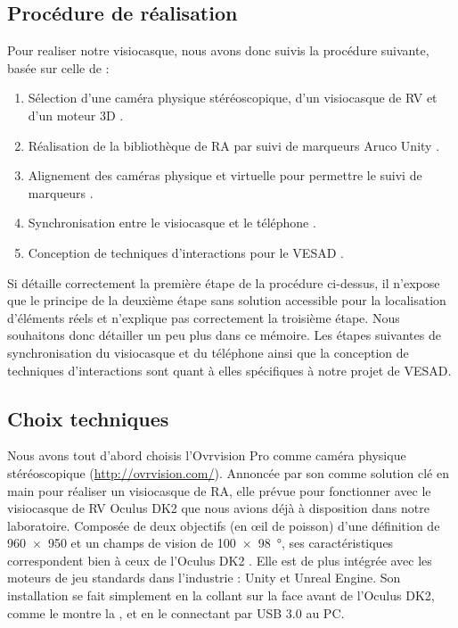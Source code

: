 \subsection{Procédure de réalisation}
\label{subsec:prototype_procedure}
Pour realiser notre visiocasque, nous avons donc suivis la procédure suivante, basée sur celle de \cite{Steptoe2013} :
\begin{enumerate}
  \item Sélection d'une caméra physique stéréoscopique, d'un visiocasque de RV et d'un moteur 3D .
  \item Réalisation de la bibliothèque de RA par suivi de marqueurs Aruco Unity .
  \item Alignement des caméras physique et virtuelle pour permettre le suivi de marqueurs .
  \item Synchronisation entre le visiocasque et le téléphone .
  \item Conception de techniques d'interactions pour le VESAD .
\end{enumerate}

Si \citeauthor{Steptoe2013} détaille correctement la première étape de la procédure ci-dessus, il n'expose que le principe de la deuxième étape sans solution accessible pour la localisation d'éléments réels et n'explique pas correctement la troisième étape. Nous souhaitons donc détailler un peu plus dans ce mémoire. Les étapes suivantes de synchronisation du visiocasque et du téléphone ainsi que la conception de techniques d'interactions sont quant à elles spécifiques à notre projet de VESAD.

\subsection{Choix techniques}
\label{subsec:technical_choices}
Nous avons tout d'abord choisis l'Ovrvision Pro comme caméra physique stéréoscopique (\url{http://ovrvision.com/}). Annoncée par son comme solution clé en main pour réaliser un visiocasque de RA, elle prévue pour fonctionner avec le visiocasque de RV Oculus DK2 que nous avions déjà à disposition dans notre laboratoire. Composée de deux objectifs  (en \oe il de poisson) d'une définition de \SI{960x950}{\px} et un champs de vision de \SI{100x98}{\degree}, ses caractéristiques correspondent bien à ceux de l'Oculus DK2 . Elle est de plus intégrée avec les moteurs de jeu standards dans l'industrie : Unity et Unreal Engine. Son installation se fait simplement en la collant sur la face avant de l'Oculus DK2, comme le montre la , et en le connectant par USB 3.0 au PC.

